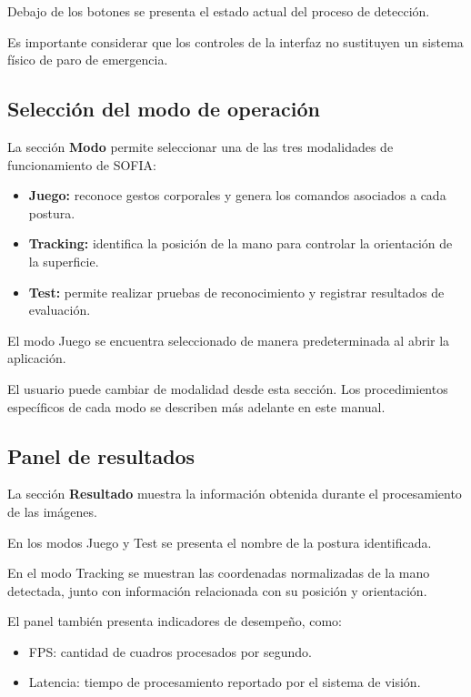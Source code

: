 \documentclass[letterpaper,journal]{IEEEtran}
\begin{document}
Debajo de los botones se presenta el estado
actual del proceso de detección.

Es importante considerar que los controles
de la interfaz no sustituyen un sistema
físico de paro de emergencia.

\subsection{Selección del modo de operación}

La sección \textbf{Modo} permite seleccionar
una de las tres modalidades de funcionamiento
de SOFIA:

\begin{itemize}
    \item \textbf{Juego:} reconoce gestos
    corporales y genera los comandos
    asociados a cada postura.

    \item \textbf{Tracking:} identifica la
    posición de la mano para controlar
    la orientación de la superficie.

    \item \textbf{Test:} permite realizar
    pruebas de reconocimiento y registrar
    resultados de evaluación.
\end{itemize}

El modo Juego se encuentra seleccionado
de manera predeterminada al abrir la
aplicación.

El usuario puede cambiar de modalidad
desde esta sección. Los procedimientos
específicos de cada modo se describen
más adelante en este manual.

\subsection{Panel de resultados}

La sección \textbf{Resultado} muestra
la información obtenida durante el
procesamiento de las imágenes.

En los modos Juego y Test se presenta
el nombre de la postura identificada.

En el modo Tracking se muestran las
coordenadas normalizadas de la mano
detectada, junto con información
relacionada con su posición y orientación.

El panel también presenta indicadores
de desempeño, como:

\begin{itemize}
    \item FPS: cantidad de cuadros
    procesados por segundo.
    \item Latencia: tiempo de procesamiento
    reportado por el sistema de visión.
\end{itemize}
\end{document}
